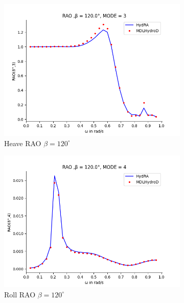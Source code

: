 \begin{figure}[H]
    \vspace{5pt}%
    \begin{subfigure}[b]{0.45\textwidth}
        \includegraphics[width=\textwidth]{plots/kcs/rao/rao3.png}
        \caption{Heave RAO $\beta = 120^{\circ}$}
    \end{subfigure}
    \begin{subfigure}[b]{0.45\textwidth}
        \includegraphics[width=\textwidth]{plots/kcs/rao/rao4.png}
        \caption{Roll RAO $\beta = 120^{\circ}$}
    \end{subfigure}
    \vspace{5pt}%
    \begin{subfigure}[b]{0.45\textwidth}

\end{subfigure}
\end{figure}
